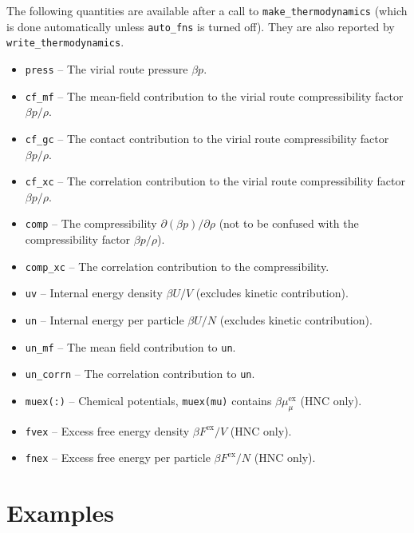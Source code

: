 \documentclass[12pt,a4paper]{article}
\newcommand{\myex}{^{\mathrm{ex}}}
\newcommand{\Fex}{F\myex}
\newcommand{\muex}{\mu\myex}
\begin{document}
%
The following quantities are available after a call to
\verb+make_thermodynamics+ (which is done automatically unless
\verb+auto_fns+ is turned off).  They are also reported by
\verb+write_thermodynamics+.
%
\begin{itemize}
%
\item\verb+press+ -- The virial route pressure $\beta p$.
%
\item\verb+cf_mf+ -- The mean-field contribution to the
virial route compressibility factor $\beta p/\rho$.
%
\item\verb+cf_gc+ -- The contact contribution to the
virial route compressibility factor $\beta p/\rho$.
%
\item\verb+cf_xc+ -- The correlation contribution to the
 virial route compressibility factor $\beta p/\rho$.
%
\item\verb+comp+ -- The compressibility $\partial(\beta
  p)/\partial\rho$ (not to be confused with the 
  compressibility factor $\beta p/\rho$).
%
\item\verb+comp_xc+ -- The correlation contribution to the
  compressibility.
%
\item\verb+uv+ -- Internal energy density $\beta U/V$ (excludes
  kinetic contribution).
%
\item\verb+un+ -- Internal energy per particle $\beta U/N$ (excludes
  kinetic contribution).
%
\item\verb+un_mf+ -- The mean field contribution to \verb+un+.
%
\item\verb+un_corrn+ -- The correlation contribution to \verb+un+.
%
\item\verb+muex(:)+ -- Chemical potentials, \verb+muex(mu)+ contains
  $\beta\muex_\mu$ (HNC only).
%
\item\verb+fvex+ -- Excess free energy density $\beta \Fex/V$ (HNC only).
%
\item\verb+fnex+ -- Excess free energy per particle $\beta \Fex/N$ (HNC only).
%
\end{itemize}

\section{Examples}
%
\end{document}
